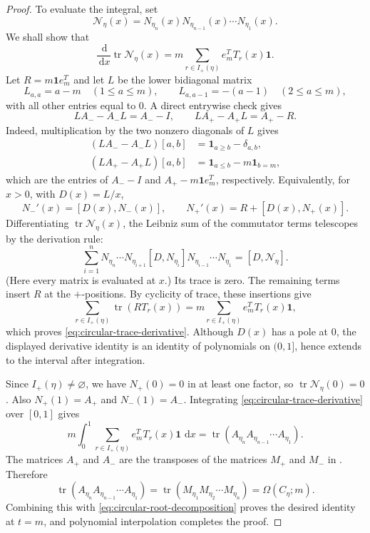 \documentclass[10pt,a4paper]{amsart}
\newcommand{\dd}{\,\mathrm{d}}
\begin{document}
\begin{proof}
To evaluate the integral, set
\[
\mathcal N_\eta(x)
=N_{\eta_n}(x)N_{\eta_{n-1}}(x)\cdots N_{\eta_1}(x).
\]
We shall show that
\begin{equation}\label{eq:circular-trace-derivative}
\frac{\dd}{\dd x}\operatorname{tr}\mathcal N_\eta(x)
=
m\sum_{r\in I_+(\eta)}e_m^T T_r(x)\mathbf 1.
\end{equation}
Let $R=m\mathbf 1 e_m^T$ and let \(L\) be the lower bidiagonal matrix
\[
L_{a,a}=a-m\quad(1\le a\le m),
\qquad
L_{a,a-1}=-(a-1)\quad(2\le a\le m),
\]
with all other entries equal to \(0\).  A direct entrywise check gives
\[
LA_- - A_-L=A_- - I,
\qquad
LA_+ - A_+L=A_+ - R.
\]
Indeed, multiplication by the two nonzero diagonals of \(L\) gives
\[
\begin{aligned}
(LA_--A_-L)[a,b]
 &=\mathbf 1_{a\ge b}-\delta_{a,b},\\
(LA_+-A_+L)[a,b]
 &=\mathbf 1_{a\le b}-m\mathbf 1_{b=m},
\end{aligned}
\]
which are the entries of \(A_--I\) and
\(A_+-m\mathbf 1e_m^T\), respectively.
Equivalently, for \(x>0\), with \(D(x)=L/x\),
\[
N_-'(x)=[D(x),N_-(x)],
\qquad
N_+'(x)=R+[D(x),N_+(x)].
\]
Differentiating \(\operatorname{tr}\mathcal N_\eta(x)\), the Leibniz sum of
the commutator terms telescopes by the derivation rule:
\[
\sum_{i=1}^{n}
 N_{\eta_n}\cdots N_{\eta_{i+1}}[D,N_{\eta_i}]
 N_{\eta_{i-1}}\cdots N_{\eta_1}
=[D,\mathcal N_\eta].
\]
(Here every matrix is evaluated at \(x\).)  Its trace is zero.  The remaining
terms insert \(R\) at the \(+\)-positions.  By cyclicity of trace, these
insertions give
\[
\sum_{r\in I_+(\eta)}
\operatorname{tr}\left(RT_r(x)\right)
=
m\sum_{r\in I_+(\eta)}e_m^T T_r(x)\mathbf 1,
\]
which proves \eqref{eq:circular-trace-derivative}.  Although \(D(x)\) has a
pole at \(0\), the displayed derivative identity is an identity of polynomials
on \((0,1]\), hence extends to the interval after integration.

Since \(I_+(\eta)\ne\varnothing\), we have \(N_+(0)=0\) in at least one factor,
so \(\operatorname{tr}\mathcal N_\eta(0)=0\).  Also
\(N_+(1)=A_+\) and \(N_-(1)=A_-\).  Integrating
\eqref{eq:circular-trace-derivative} over \([0,1]\) gives
\[
m\int_0^1\sum_{r\in I_+(\eta)} e_m^T T_r(x)\mathbf 1\,\dd x
=
\operatorname{tr}\left(A_{\eta_n}A_{\eta_{n-1}}\cdots A_{\eta_1}\right).
\]
The matrices \(A_+\) and \(A_-\) are the transposes of the matrices \(M_+\) and
\(M_-\) in .  Therefore
\[
\operatorname{tr}\left(A_{\eta_n}A_{\eta_{n-1}}\cdots A_{\eta_1}\right)
=
\operatorname{tr}\left(M_{\eta_1}M_{\eta_2}\cdots M_{\eta_n}\right)
=
\Omega(C_\eta;m).
\]
Combining this with \eqref{eq:circular-root-decomposition} proves the desired
identity at \(t=m\), and polynomial interpolation completes the proof.
\end{proof}
\end{document}
